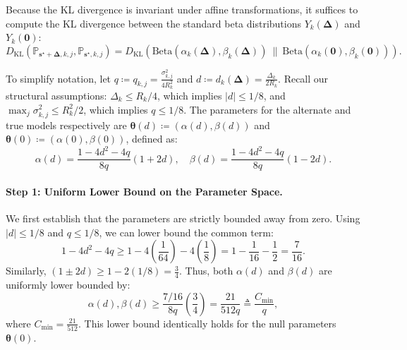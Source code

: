 \documentclass{article}
\newcommand{\Beta}{\mathrm{Beta}}
\def\vs{{\bm{s}}}
\def\sP{{\mathbb{P}}}
\newcommand{\KL}{D_{\mathrm{KL}}}
\theoremstyle{plain}
\theoremstyle{definition}
\theoremstyle{plain}
\begin{document}
Because the KL divergence is invariant under affine transformations, it suffices to compute the KL divergence between the standard beta distributions $Y_k(\bm\Delta)$ and $Y_k(\mathbf{0})$:
\begin{equation}
    \KL\left( \sP_{\vs^\star+\bm\Delta,k,j}, \sP_{\vs^\star,k,j} \right) = \KL\left( \Beta(\alpha_k(\bm\Delta), \beta_k(\bm\Delta)) \ \| \ \Beta(\alpha_k(\mathbf{0}), \beta_k(\mathbf{0})) \right).
\end{equation}

To simplify notation, let $q \coloneq q_{k,j} = \frac{\sigma_{k,j}^2}{4 R_k^2}$ and $d \coloneq d_k(\bm\Delta) = \frac{\Delta_k}{2 R_k}$.
Recall our structural assumptions: $\Delta_k \leq R_k / 4$, which implies $|d| \leq 1/8$, and $\max_j\sigma_{k,j}^2 \leq R_k^2 / 2$, which implies $q \leq 1/8$.
The parameters for the alternate and true models respectively are $\bm\theta(d) \coloneq (\alpha(d), \beta(d))$ and $\bm\theta(0) \coloneq (\alpha(0), \beta(0))$, defined as:
\begin{equation}
    \alpha(d) = \frac{1 - 4 d^2 - 4 q}{8 q} (1 + 2d), \quad \beta(d) = \frac{1 - 4 d^2 - 4 q}{8 q} (1 - 2d).
\end{equation}

\paragraph{Step 1: Uniform Lower Bound on the Parameter Space.}
We first establish that the parameters are strictly bounded away from zero.
Using $|d| \leq 1/8$ and $q \leq 1/8$, we can lower bound the common term:
\begin{equation}
    1 - 4 d^2 - 4 q \geq 1 - 4\left(\frac{1}{64}\right) - 4\left(\frac{1}{8}\right) = 1 - \frac{1}{16} - \frac{1}{2} = \frac{7}{16}.
\end{equation}
Similarly, $(1 \pm 2d) \geq 1 - 2(1/8) = \frac{3}{4}$. Thus, both $\alpha(d)$ and $\beta(d)$ are uniformly lower bounded by:
\begin{equation}
    \alpha(d), \beta(d) \geq \frac{7/16}{8 q} \left(\frac{3}{4}\right) = \frac{21}{512 q} \triangleq \frac{C_{\min}}{q},
\end{equation}
where $C_{\min} = \frac{21}{512}$. This lower bound identically holds for the null parameters $\bm\theta(0)$.
\end{document}
